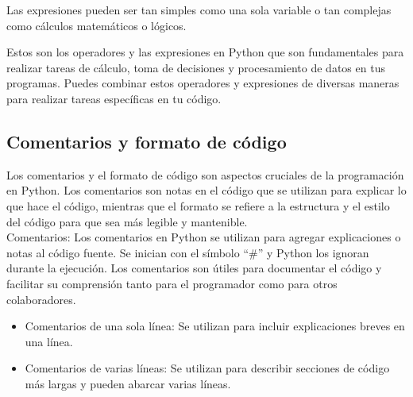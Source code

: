 \begin{figure}[h]
    \centering
  \end{figure}
Las expresiones pueden ser tan simples como una sola variable o tan complejas como cálculos matemáticos o lógicos.

Estos son los operadores y las expresiones en Python que son fundamentales para realizar tareas de cálculo, toma de decisiones y procesamiento de datos en tus programas. Puedes combinar estos operadores y expresiones de diversas maneras para realizar tareas específicas en tu código.

\subsection{Comentarios y formato de código}
Los comentarios y el formato de código son aspectos cruciales de la programación en Python. Los comentarios son notas en el código que se utilizan para explicar lo que hace el código, mientras que el formato se refiere a la estructura y el estilo del código para que sea más legible y mantenible.\\

Comentarios: Los comentarios en Python se utilizan para agregar explicaciones o notas al código fuente. Se inician con el símbolo ``\#'' y Python los ignoran durante la ejecución. Los comentarios son útiles para documentar el código y facilitar su comprensión tanto para el programador como para otros colaboradores. 
\begin{figure}[h]
    \centering
  \end{figure}
\begin{itemize}
    \item Comentarios de una sola línea: Se utilizan para incluir explicaciones breves en una línea.
    \item Comentarios de varias líneas: Se utilizan para describir secciones de código más largas y pueden abarcar varias líneas.
\end{itemize}

